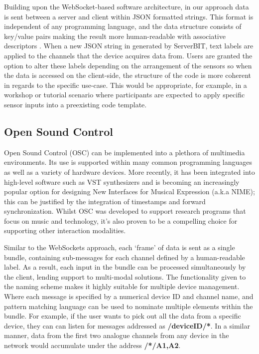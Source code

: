 Building upon the WebSocket-based software architecture, in our approach data is sent between a server and client within JSON formatted strings. This format is independent of any programming language, and the data structure consists of key/value pairs making the result more human-readable with associative descriptors \cite{marrs_json_2017}. When a new JSON string in generated by ServerBIT, text labels are applied to the channels that the device acquires data from. Users are granted the option to alter these labels depending on the arrangement of the sensors so when the data is accessed on the client-side, the structure of the code is more coherent in regards to the specific use-case. This would be appropriate, for example, in a workshop or tutorial scenario where participants are expected to apply specific sensor inputs into a preexisting code template.

\subsection{Open Sound Control}

Open Sound Control (OSC) can be implemented into a plethora of multimedia environments. Its use is supported within many common programming languages as well as a variety of hardware devices. More recently, it has been integrated into high-level software such as VST synthesizers and is becoming an increasingly popular option for designing New Interfaces for Musical Expression (a.k.a NIME); this can be justified by the integration of timestamps and forward synchronization\cite{schmeder_best_2010}. Whilst OSC was developed to support research programs that focus on music and technology\cite{freed_features_2009}, it’s also proven to be a compelling choice for supporting other interaction modalities.

Similar to the WebSockets approach, each ‘frame’ of data is sent as a single bundle, containing sub-messages for each channel defined by a human-readable label. As a result, each input in the bundle can be processed simultaneously by the client, lending support to multi-modal solutions. The functionality given to the naming scheme makes it highly suitable for multiple device management. Where each message is specified by a numerical device ID and channel name, and pattern matching language can be used to nominate multiple elements within the bundle. For example, if the user wants to pick out all the data from a specific device, they can can listen for messages addressed as \textbf{/deviceID/*}. In a similar manner, data from the first two analogue channels from any device in the network would accumulate under the address \textbf{/*/{A1,A2}}.

